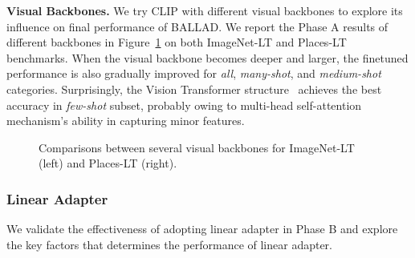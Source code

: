 \documentclass[10pt,twocolumn,letterpaper]{article}
\newcommand{\approach}{\textsc{BALLAD}}
\begin{document}
\noindent\textbf{Visual Backbones.}
We try CLIP with different visual backbones to explore its influence on final performance of \approach{}. We report the Phase A results of different backbones in Figure~\ref{fig:backbone} on both ImageNet-LT and Places-LT benchmarks. When the visual backbone becomes deeper and larger, the finetuned performance is also gradually improved for \textit{all}, \textit{many-shot}, and \textit{medium-shot} categories. Surprisingly, the Vision Transformer structure~\cite{dosovitskiy2021an} achieves the best accuracy in \textit{few-shot} subset, probably owing to multi-head self-attention mechanism's ability in capturing minor features.
\vspace{-10pt}




\begin{figure}[t!]
   \centering
   \vspace{-10pt}
   \hspace{-2mm}
    \hfill
\hspace{-8mm}
\caption{Comparisons between several visual backbones for ImageNet-LT (left) and Places-LT (right).}
	\vspace{-15pt}
	\label{fig:backbone}
\end{figure}

\subsubsection{Linear Adapter}
\label{subsec:adapter}
We validate the effectiveness of adopting linear adapter in Phase B and explore the key factors that determines the performance of linear adapter.
\end{document}
